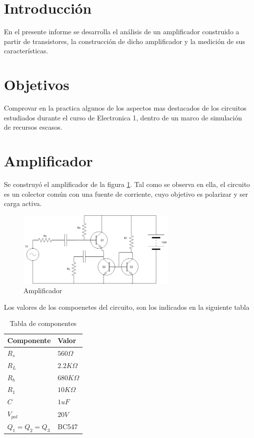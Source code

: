 \documentclass[../../main.tex]{subfiles}
\begin{document}
\section{Introducción}
En el presente informe se desarrolla el análisis de un amplificador construido a partir de transistores, la construcción de dicho amplificador y la medición de sus características.
\section{Objetivos}
Comprovar en la practica algunos de los aspectos mas destacados de los circuitos estudiados durante el curso de Electronica 1, dentro de un marco de simulación de recursos escasos.

\section{Amplificador}
Se construyó el amplificador de la figura \ref{fig:cir}. Tal como se observa en ella, el circuito es un colector común con una fuente de corriente, cuyo objetivo es polarizar y ser carga activa.

\begin{figure}[H]	
	\centering
	\includegraphics[width=0.7\textwidth]{imagenes/circuito.png}
	\caption{Amplificador}\label{fig:cir}
\end{figure}

Los valores de los compoenetes del circuito, son los indicados en la siguiente tabla
\begin{table}[h]
\begin{center}
\begin{tabular}{|l|l|}
\hline
Componente& Valor\\
\hline \hline
$R_s$ & $560 \Omega$  \\ \hline
$R_L$ & $2.2 K \Omega$  \\ \hline
$R_b$ & $680 K \Omega$  \\ \hline
$R_1$ & $10K\Omega$  \\ \hline
$C$ & $1uF$  \\ \hline
$V_{pol}$ & $20V$  \\ \hline
$Q_1 = Q_2 = Q_3$ & BC547  \\ \hline

\end{tabular}
\caption{Tabla de componentes} \label{tab:comp}
\end{center}
\end{table}
\end{document}
